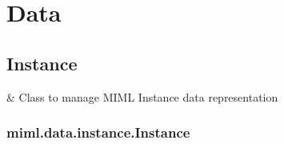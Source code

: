 \documentclass[letterpaper,10pt,english]{sphinxmanual}
\begin{document}
\sphinxstepscope


\chapter{Data}
\label{\detokenize{data/index:data}}\label{\detokenize{data/index::doc}}
\sphinxstepscope


\section{Instance}
\label{\detokenize{data/instance:instance}}\label{\detokenize{data/instance::doc}}

\begin{savenotes}\sphinxattablestart
\sphinxthistablewithglobalstyle
\sphinxthistablewithnovlinesstyle
\centering
\begin{tabulary}{\linewidth}[t]{}
\sphinxtoprule
\sphinxtableatstartofbodyhook
\sphinxAtStartPar
{\hyperref[\detokenize{data/_autosummary/miml.data.instance.Instance:miml.data.instance.Instance}]{}}
&
\sphinxAtStartPar
Class to manage MIML Instance data representation
\\
\sphinxbottomrule
\end{tabulary}
\sphinxtableafterendhook\par
\sphinxattableend\end{savenotes}

\sphinxstepscope


\subsection{miml.data.instance.Instance}
\label{\detokenize{data/_autosummary/miml.data.instance.Instance:miml-data-instance-instance}}\label{\detokenize{data/_autosummary/miml.data.instance.Instance::doc}}
\end{document}
